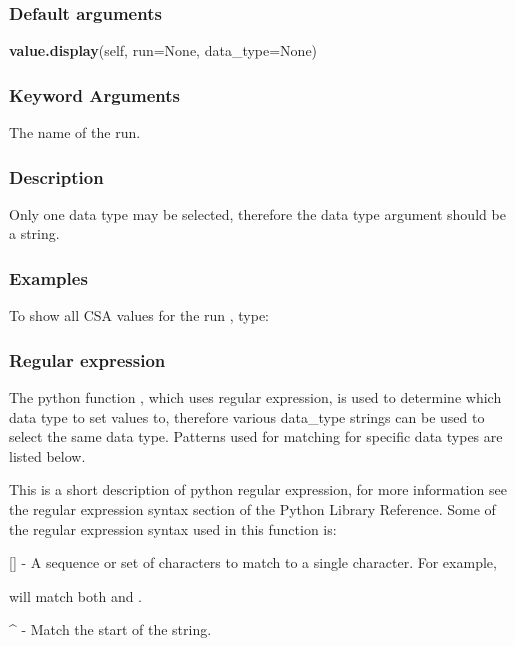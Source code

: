 \subsubsection{Default arguments}

\textsf{\textbf{value.display}(self, run=None, data\_type=None)}


\subsubsection{Keyword Arguments}

  The name of the run.


\subsubsection{Description}

Only one data type may be selected, therefore the data type argument should be a string.


\subsubsection{Examples}

To show all CSA values for the run 
, type:






\subsubsection{Regular expression}

The python function 
, which uses regular expression, is used to determine which data
type to set values to, therefore various data\_type strings can be used to select the same
data type.  Patterns used for matching for specific data types are listed below.

This is a short description of python regular expression, for more information see the
regular expression syntax section of the Python Library Reference.  Some of the regular
expression syntax used in this function is:

    [] - A sequence or set of characters to match to a single character.  For example,
    
 will match both 
 and 
.

    \^{} - Match the start of the string.

